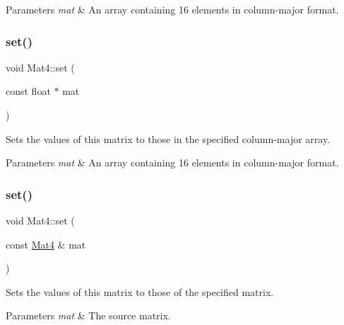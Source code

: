 \begin{DoxyParams}{Parameters}
{\em mat} & An array containing 16 elements in column-\/major format. \\
\hline
\end{DoxyParams}
\mbox{\label{classMat4_aa41cf66bbbeaf8520730a1e119576ed3}} 
\subsubsection{\texorpdfstring{set()}{set()}\hspace{0.1cm}{\footnotesize\ttfamily [4/6]}}
{\footnotesize\ttfamily void Mat4\+::set (\begin{DoxyParamCaption}\item[{const float $\ast$}]{mat }\end{DoxyParamCaption})}

Sets the values of this matrix to those in the specified column-\/major array.


\begin{DoxyParams}{Parameters}
{\em mat} & An array containing 16 elements in column-\/major format. \\
\hline
\end{DoxyParams}
\mbox{\label{classMat4_a4673b21f6cf96fb2274be6227a877061}} 
\subsubsection{\texorpdfstring{set()}{set()}\hspace{0.1cm}{\footnotesize\ttfamily [5/6]}}
{\footnotesize\ttfamily void Mat4\+::set (\begin{DoxyParamCaption}\item[{const \hyperlink{classMat4}{Mat4} \&}]{mat }\end{DoxyParamCaption})}

Sets the values of this matrix to those of the specified matrix.


\begin{DoxyParams}{Parameters}
{\em mat} & The source matrix. \\
\hline
\end{DoxyParams}
\mbox{\label{classMat4_a4673b21f6cf96fb2274be6227a877061}} 
